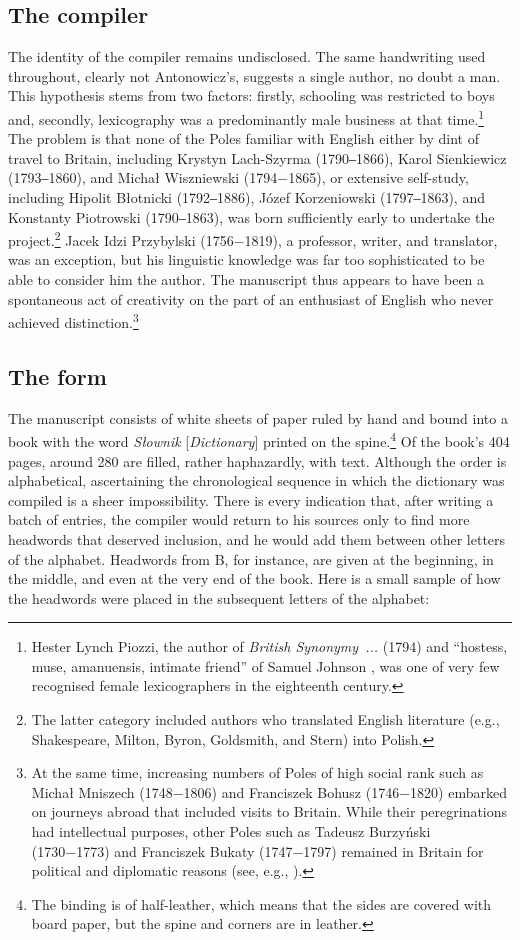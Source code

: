 \documentclass[output=paper,colorlinks,citecolor=brown,arabicfont,chinesefont]{langscibook}
\begin{document}
\subsection{The compiler}

The identity of the compiler remains undisclosed. The same handwriting used throughout, clearly not Antonowicz’s, suggests a single author, no doubt a man. This hypothesis stems from two factors: firstly, schooling was restricted to boys and, secondly, lexicography was a predominantly male business at that time.\footnote{Hester Lynch Piozzi, the author of \emph{British Synonymy~...} (1794) and “hostess, muse, amanuensis, intimate friend” of Samuel Johnson \citep[69]{Berglund_lisa2010}, was one of very few recognised female lexicographers in the eighteenth century.} The problem is that none of the Poles familiar with English either by dint of travel to Britain, including Krystyn Lach-Szyrma (1790‒1866), Karol Sienkiewicz (1793‒1860), and Michał Wiszniewski (1794−1865), or extensive self-study, including Hipolit Błotnicki (1792‒1886), Józef Korzeniowski (1797‒1863), and Konstanty Piotrowski (1790‒1863), was born sufficiently early to undertake the project.\footnote{The latter category included authors who translated English literature (e.g., Shakespeare, Milton, Byron, Goldsmith, and Stern) into Polish.} Jacek Idzi Przybylski (1756−1819), a professor, writer, and translator, was an exception, but his linguistic knowledge was far too sophisticated to be able to consider him the author. The manuscript thus appears to have been a spontaneous act of creativity on the part of an enthusiast of English who never achieved distinction.\footnote{At the same time, increasing numbers of Poles of high social rank such as Michał Mniszech (1748−1806) and Franciszek Bohusz (1746−1820) embarked on journeys abroad that included visits to Britain. While their peregrinations had intellectual purposes, other Poles such as Tadeusz Burzyński (1730−1773) and Franciszek Bukaty (1747−1797) remained in Britain for political and diplomatic reasons (see, e.g., \citealt{Libiszowska_zofia1972}).}

\subsection{The form}

The manuscript consists of white sheets of paper ruled by hand and bound into a book with the word \emph{Słownik} [\emph{Dictionary}] printed on the spine.\footnote{The binding is of half-leather, which means that the sides are covered with board paper, but the spine and corners are in leather.} Of the book’s 404 pages, around 280 are filled, rather haphazardly, with text. Although the order is alphabetical, ascertaining the chronological sequence in which the dictionary was compiled is a sheer impossibility. There is every indication that, after writing a batch of entries, the compiler would return to his sources only to find more headwords that deserved inclusion, and he would add them between other letters of the alphabet. Headwords from B, for instance, are given at the beginning, in the middle, and even at the very end of the book. Here is a small sample of how the headwords were placed in the subsequent letters of the alphabet:
\end{document}
